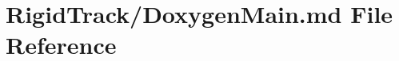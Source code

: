 \hypertarget{_doxygen_main_8md}{}\section{Rigid\+Track/\+Doxygen\+Main.md File Reference}
\label{_doxygen_main_8md}
